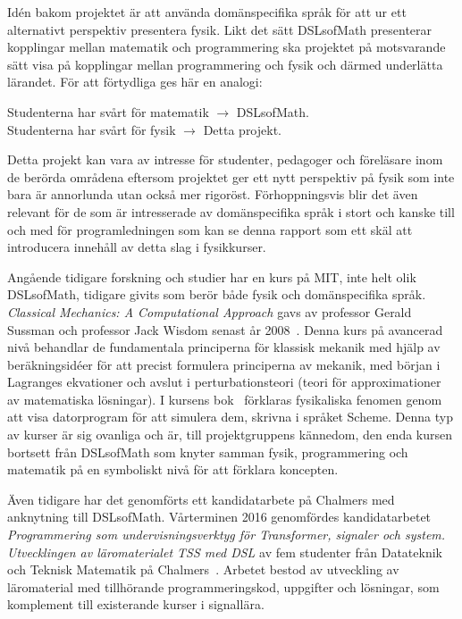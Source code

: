 Idén bakom projektet är att använda domänspecifika språk för att ur ett alternativt perspektiv presentera fysik. Likt det sätt DSLsofMath
presenterar kopplingar mellan matematik och programmering ska projektet på motsvarande sätt visa på kopplingar mellan programmering och fysik och därmed
underlätta lärandet. För att förtydliga ges här en analogi:


\begin{center}
Studenterna har svårt för matematik $\rightarrow $ DSLsofMath.\\
Studenterna har svårt för fysik $\rightarrow $ Detta projekt.
\end{center}

Detta projekt kan vara av intresse för studenter, pedagoger och
föreläsare inom de berörda områdena eftersom projektet ger ett nytt
perspektiv på fysik som inte bara är annorlunda utan också mer rigoröst.
Förhoppningsvis blir det även relevant för de som är intresserade av
domänspecifika språk i stort och kanske till och med för programledningen som
kan se denna rapport som ett skäl att introducera innehåll av detta slag i
fysikkurser.

Angående tidigare forskning och studier har en kurs på MIT, inte helt olik
DSLsofMath, tidigare givits som berör både fysik och
domänspecifika språk.
\textit{Classical Mechanics: A Computational Approach} gavs av professor Gerald Sussman
och professor Jack Wisdom senast år 2008~\cite{classical-mechanics-course-mit-2008}.
Denna kurs på avancerad nivå behandlar de fundamentala principerna för klassisk
mekanik med hjälp av beräkningsidéer för att precist formulera principerna av
mekanik, med början i Lagranges ekvationer och avslut i perturbationsteori
(teori för approximationer av matematiska lösningar). I kursens bok~\cite{SICM}
förklaras fysikaliska fenomen genom att visa datorprogram för att simulera dem,
skrivna i språket Scheme. Denna typ av kurser är sig ovanliga och är, till
projektgruppens kännedom, den enda kursen bortsett från DSLsofMath  som knyter
samman fysik, programmering och matematik på en symboliskt nivå för att förklara
koncepten.

Även tidigare har det genomförts ett kandidatarbete på Chalmers med anknytning till DSLsofMath.
Vårterminen 2016 genomfördes kandidatarbetet \textit{Programmering som
undervisningsverktyg för Transformer, signaler och system. Utvecklingen av
läromaterialet TSS med DSL} av fem studenter från Datateknik och Teknisk
Matematik på Chalmers~\cite{kandidat2016}. Arbetet bestod av utveckling av läromaterial med
tillhörande programmeringskod, uppgifter och lösningar, som komplement till
existerande kurser i signallära.

